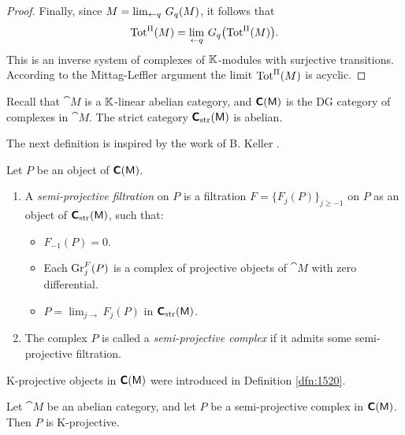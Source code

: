 \begin{proof}
Finally, since $M = \lim_{\leftarrow q} \, G_q(M)$, 
it follows that 
\[ \opn{Tot}^{\Pi}(M) = \lb \lim_{\lar q} \,
G_q \bigl( \opn{Tot}^{\Pi}(M) \bigr) . \]
This is an inverse system of complexes of $\mathbb{K}$-modules with surjective 
transitions. According to the Mittag-Leffler argument the limit
$\operatorname{Tot}^{\Pi}(M)$ is acyclic.
\end{proof}



\label{subsec:exis-K-prj}


Recall that $\cat{M}$ is a $\mathbb{K}$-linear abelian category, and 
$\boldsymbol{\mathsf{C}}(\operatorname{\mathsf{M}})$ is the DG category of complexes in $\cat{M}$. The strict 
category $\boldsymbol{\mathsf{C}}_{\mathrm{str}}(\operatorname{\mathsf{M}})$ is abelian. 

The next definition is inspired by the work of B. Keller 
\cite[Section 3.1]{Kel1}. 

\begin{dfn} \label{dfn:1535}
Let $P$ be an object of $\boldsymbol{\mathsf{C}}(\operatorname{\mathsf{M}})$. 
\begin{enumerate}
\item A {\em semi-projective filtration}%
on $P$ is a filtration 
$F = \{ F_j(P) \}_{j \geq -1}$
on $P$ as an object of $\boldsymbol{\mathsf{C}}_{\mathrm{str}}(\operatorname{\mathsf{M}})$, such that:
\begin{itemize}
\item $F_{-1}(P) = 0$. 
\item  Each $\operatorname{Gr}^F_j(P)$ 
is a complex of projective objects of $\cat{M}$ with zero differential.
\item $P = \lim_{j \to} F_j(P)$ in $\boldsymbol{\mathsf{C}}_{\mathrm{str}}(\operatorname{\mathsf{M}})$.
\end{itemize}

\item The complex $P$ is called a 
{\em semi-projective complex}%
if it admits some semi-projective filtration. 
\end{enumerate}
\end{dfn}

K-projective objects in $\boldsymbol{\mathsf{C}}(\operatorname{\mathsf{M}})$ were introduced in Definition 
\ref{dfn:1520}.

\begin{thm} \label{thm:1536}
Let $\cat{M}$ be an abelian category, and let $P$ be a 
semi-projective complex in $\boldsymbol{\mathsf{C}}(\operatorname{\mathsf{M}})$. Then $P$ is 
K-projective. 
\end{thm}

